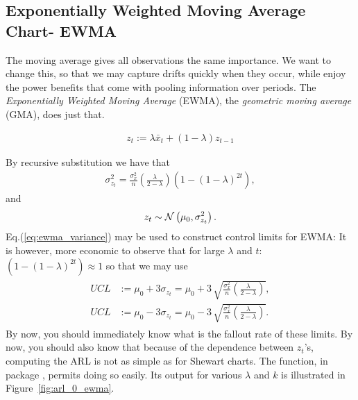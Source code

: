 \subsection{Exponentially Weighted Moving Average Chart- EWMA}
The moving average gives all observations the same importance. 
We want to change this, so that we may capture drifts quickly when they occur, while enjoy the power benefits that come with pooling information over periods. 
The \emph{Exponentially Weighted Moving Average} (EWMA), \aka the \emph{geometric moving average} (GMA), does just that. 
\begin{definition}
\begin{align}
	z_t:= \lambda \bar{x}_t + (1-\lambda) z_{t-1}
\end{align}
\end{definition}

By recursive substitution we have that 
\begin{align}
\label{eq:ewma_variance}
	\sigma^2_{z_t}=\frac{\sigma^2_x}{n}\left( \frac{\lambda}{2-\lambda} \right)(1-(1-\lambda)^{2t}),
\end{align}
and 
\begin{align}
	z_t \sim \mathcal{N}\left(\mu_0,	\sigma^2_{z_t} \right).
\end{align}
Eq.(\ref{eq:ewma_variance}) may be used to construct control limits for EWMA:
It is however, more economic to observe that for large $\lambda$ and $t$: $(1-(1-\lambda)^{2t}) \approx 1$ so that we may use 
\begin{align}
\begin{split}
\label{eq:ewma_variance_approximate}
	UCL &:= \mu_0 + 3 \sigma_{z_t}= \mu_0 + 3 \, \sqrt{\frac{\sigma^2_x}{n}\left( \frac{\lambda}{2-\lambda} \right)},  \\
	UCL &:= \mu_0 - 3 \sigma_{z_t}= \mu_0 - 3 \, \sqrt{\frac{\sigma^2_x}{n}\left( \frac{\lambda}{2-\lambda} \right)}.
\end{split}
\end{align}
By now, you should immediately know what is the fallout rate of these limits.
By now, you should also know that because of the dependence between $z_t$'s, computing the ARL is not as simple as for Shewart charts. The  \R function, in package , permits doing so easily. 
Its output for various $\lambda$ and $k$ is illustrated in Figure~\ref{fig:arl_0_ewma}.

